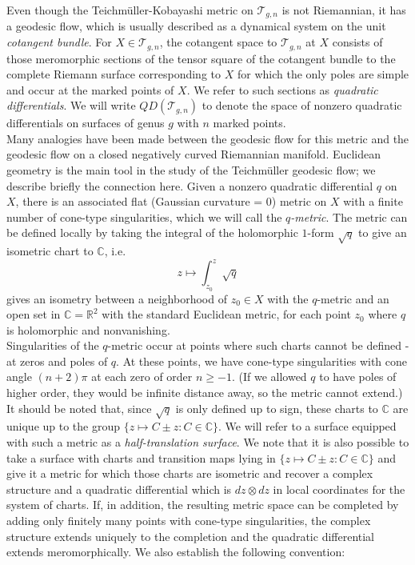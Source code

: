 \documentclass[12pt]{article}
\newcommand{\rr}{\mathbb{R}}
\newcommand{\cc}{\mathbb{C}}
\begin{document}
\noindent Even though the Teichm\"uller-Kobayashi metric on $\mathcal{T}_{g,n}$ is not Riemannian, it has a geodesic flow, which is usually described as a dynamical system on the unit \emph{cotangent bundle}. For $X \in \mathcal{T}_{g,n}$, the cotangent space to $\mathcal{T}_{g,n}$ at $X$ consists of those meromorphic sections of the tensor square of the cotangent bundle to the complete Riemann surface corresponding to $X$ for which the only poles are simple and occur at the marked points of $X$. We refer to such sections as \emph{quadratic differentials}. We will write $QD(\mathcal{T}_{g,n})$ to denote the space of nonzero quadratic differentials on surfaces of genus $g$ with $n$ marked points.\\

\noindent Many analogies have been made between the geodesic flow for this metric and the geodesic flow on a closed negatively curved Riemannian manifold. Euclidean geometry is the main tool in the study of the Teichm\"uller geodesic flow; we describe briefly the connection here. Given a nonzero quadratic differential $q$ on $X$, there is an associated flat (Gaussian curvature = 0) metric on $X$ with a finite number of cone-type singularities, which we will call the \emph{$q$-metric}. The metric can be defined locally by taking the integral of the holomorphic $1$-form $\sqrt{q}$ to give an isometric chart to $\cc$, i.e. $$z \mapsto \int_{z_0}^z \sqrt{q}$$ gives an isometry between a neighborhood of $z_0 \in X$ with the $q$-metric and an open set in $\cc = \rr^2$ with the standard Euclidean metric, for each point $z_0$ where $q$ is holomorphic and nonvanishing.\\

\noindent Singularities of the $q$-metric occur at points where such charts cannot be defined - at zeros and poles of $q$. At these points, we have cone-type singularities with cone angle $(n+2)\pi$ at each zero of order $n \geq -1$. (If we allowed $q$ to have poles of higher order, they would be infinite distance away, so the metric cannot extend.) It should be noted that, since $\sqrt{q}$ is only defined up to sign, these charts to $\cc$ are unique up to the group $\{z \mapsto C \pm z: C \in \cc\}$. We will refer to a surface equipped with such a metric as a \emph{half-translation surface}. We note that it is also possible to take a surface with charts and transition maps lying in $\{z \mapsto C \pm z: C \in \cc\}$ and give it a metric for which those charts are isometric and recover a complex structure and a quadratic differential which is $dz \otimes dz$ in local coordinates for the system of charts. If, in addition, the resulting metric space can be completed by adding only finitely many points with cone-type singularities, the complex structure extends uniquely to the completion and the quadratic differential extends meromorphically. We also establish the following convention:\\
\end{document}
